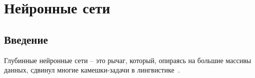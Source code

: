 \section{Нейронные сети} \label{sect_nn}

\subsection{Введение} \label{sect_nn_review}

Глубинные нейронные сети -- это рычаг, который, опираясь на большие массивы данных, сдвинул многие камешки-задачи в лингвистике~\cite[2827]{Cruz-Anastasopoulos-Stump2020Chatino}.

